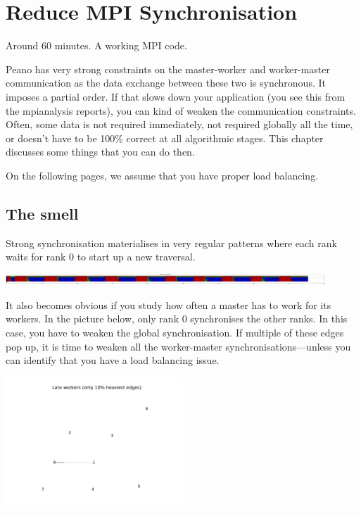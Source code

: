 \section{Reduce MPI Synchronisation}


\chapterDescription
  {
    Around 60 minutes.
  }
  {
    A working MPI code.
  }


Peano has very strong constraints on the master-worker and worker-master
communication as the data exchange between these two is synchronous. It imposes
a partial order. If that slows down your application (you see this from the
mpianalysis reports), you can kind of weaken the communication constraints. 
Often, some data is not required immediately, not required globally all the
time, or doesn't have to be 100\% correct at all algorithmic stages. This
chapter discusses some things that you can do then.

On the following pages, we assume that you have proper load balancing.


\subsection{The smell}

Strong synchronisation materialises in very regular patterns where each rank
waits for rank 0 to start up a new traversal.

\begin{center}
  \includegraphics[width=0.9\textwidth]{43_mpi-synchronisation/mpi-phases-before.pdf}
\end{center}

It also becomes obvious if you study how often a master has to work for its 
workers. 
In the picture below, only rank 0 synchronises the other ranks.
In this case, you have to weaken the global synchronisation.
If multiple of these edges pop up, it is time to weaken all the worker-master
synchronisations---unless you can identify that you have a load balancing issue.


\begin{center}
  \includegraphics[width=0.5\textwidth]{43_mpi-synchronisation/master-worker-before.pdf}
\end{center}


